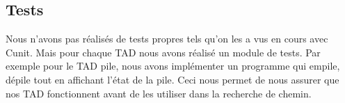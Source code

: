 \subsection{Tests}
Nous n'avons pas réalisés de tests propres tels qu'on les a vus en cours avec Cunit. Mais pour chaque 
TAD nous avons réalisé un module de tests. Par exemple pour le TAD pile, nous avons implémenter un 
programme qui empile, dépile tout en affichant l'état de la pile. Ceci nous permet de nous assurer
que nos TAD fonctionnent avant de les utiliser dans la recherche de chemin.